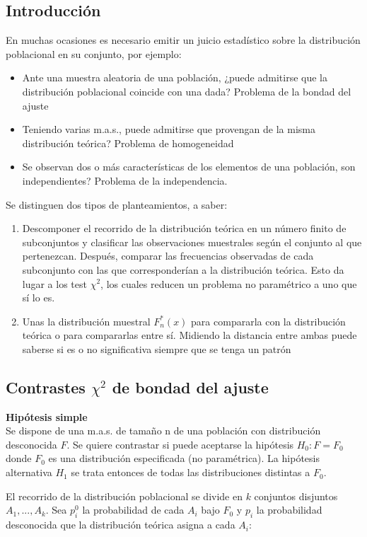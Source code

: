 \documentclass[a4paper,12pt]{article}
\begin{document}
\subsection{Introducción}
En muchas ocasiones es necesario emitir un juicio estadístico sobre la distribución poblacional en su conjunto, por ejemplo:
\begin{itemize}
\item Ante una muestra aleatoria de una población, ¿puede admitirse que la distribución poblacional coincide con una dada? Problema de la bondad del ajuste
\item Teniendo varias m.a.s., puede admitirse que provengan de la misma distribución teórica? Problema de homogeneidad
\item Se observan dos o más características de los elementos de una población, son independientes? Problema de la independencia.
\end{itemize}

Se distinguen dos tipos de planteamientos, a saber:
\begin{enumerate}
\item Descomponer el recorrido de la distribución teórica en un número finito de subconjuntos y clasificar las observaciones muestrales según el conjunto al que pertenezcan. Después, comparar las frecuencias observadas de cada subconjunto con las que corresponderían a la distribución teórica. Esto da lugar a los test $\chi^2$, los cuales reducen un problema no paramétrico a uno que sí lo es.
\item Unas la distribución muestral $F^*_n(x)$ para compararla con la distribución teórica o para compararlas entre sí. Midiendo la distancia entre ambas puede saberse si es o no significativa siempre que se tenga un patrón
\end{enumerate}

\subsection{Contrastes $\chi^2$ de bondad del ajuste}
\textbf{Hipótesis simple} \\
Se dispone de una m.a.s. de tamaño n de una población con distribución desconocida $F$. Se quiere contrastar si puede aceptarse la hipótesis $H_0 : F = F_0$ donde $F_0$ es una distribución especificada (no paramétrica). La hipótesis alternativa $H_1$ se trata entonces de todas las distribuciones distintas a $F_0$.

El recorrido de la distribución poblacional se divide en $k$ conjuntos disjuntos $A_1,...,A_k$. Sea $p^0_i$ la probabilidad de cada $A_i$ bajo $F_0$ y $p_i$ la probabilidad desconocida que la distribución teórica asigna a cada $A_i$:
\end{document}
